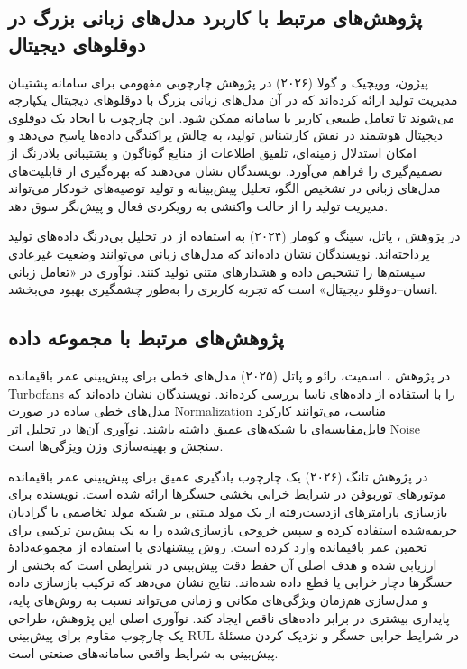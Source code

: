 \subsection{پژوهش‌های مرتبط با کاربرد مدل‌های زبانی بزرگ در دوقلوهای دیجیتال}

پیژون، وویچیک و گولا (۲۰۲۶) در پژوهش 
\cite{Pizon2026integrating} چارچوبی مفهومی برای سامانه پشتیبان مدیریت تولید ارائه کرده‌اند که در آن مدل‌های زبانی بزرگ با دوقلوهای دیجیتال یکپارچه می‌شوند تا تعامل طبیعی کاربر با سامانه ممکن شود. این چارچوب با ایجاد یک دوقلوی دیجیتال هوشمند در نقش کارشناس تولید، به چالش پراکندگی داده‌ها پاسخ می‌دهد و امکان استدلال زمینه‌ای، تلفیق اطلاعات از منابع گوناگون و پشتیبانی بلادرنگ از تصمیم‌گیری را فراهم می‌آورد. نویسندگان نشان می‌دهند که بهره‌گیری از قابلیت‌های مدل‌های زبانی در تشخیص الگو، تحلیل پیش‌بینانه و تولید توصیه‌های خودکار می‌تواند مدیریت تولید را از حالت واکنشی به رویکردی فعال و پیش‌نگر سوق دهد.



در پژوهش \cite{patel2024llmdt}،
پاتل، سینگ و کومار (۲۰۲۴)
   به استفاده از  در تحلیل بی‌درنگ داده‌های تولید پرداخته‌اند. نویسندگان نشان داده‌اند که مدل‌های زبانی می‌توانند وضعیت غیرعادی سیستم‌ها را تشخیص داده و هشدارهای متنی تولید کنند. نوآوری در «تعامل زبانی انسان–دوقلو دیجیتال» است که تجربه کاربری را به‌طور چشمگیری بهبود می‌بخشد.



\subsection{پژوهش‌های مرتبط با مجموعه داده }

در پژوهش
 \cite{smith2025cmapsslinear}،
اسمیت، رائو و پاتل (۲۰۲۵)
    مدل‌های خطی برای پیش‌بینی عمر باقیمانده 
    \glspl{Turbofan}
     را با استفاده از داده‌های 
	  ناسا بررسی کرده‌اند. نویسندگان نشان داده‌اند که مدل‌های خطی ساده در صورت \gls{Normalization} مناسب، می‌توانند کارکرد قابل‌مقایسه‌ای با شبکه‌های عمیق داشته باشند. نوآوری آن‌ها در تحلیل اثر \gls{Noise} سنجش و بهینه‌سازی وزن ویژگی‌ها است.

	

در پژوهش
تانگ (۲۰۲۶)
\cite{tang2026sensorfailure}
یک چارچوب یادگیری عمیق برای پیش‌بینی عمر باقیمانده موتورهای توربوفن در شرایط خرابی بخشی حسگرها ارائه شده است. نویسنده برای بازسازی پارامترهای ازدست‌رفته از یک مولد مبتنی بر شبکه مولد تخاصمی با گرادیان جریمه‌شده استفاده کرده و سپس خروجی بازسازی‌شده را به یک پیش‌بین ترکیبی
برای تخمین عمر باقیمانده وارد کرده است. روش پیشنهادی با استفاده از مجموعه‌دادهٔ  ارزیابی شده و هدف اصلی آن حفظ دقت پیش‌بینی در شرایطی است که بخشی از حسگرها دچار خرابی یا قطع داده شده‌اند. نتایج نشان می‌دهد که ترکیب بازسازی داده و مدل‌سازی هم‌زمان ویژگی‌های مکانی و زمانی می‌تواند نسبت به روش‌های پایه، پایداری بیشتری در برابر داده‌های ناقص ایجاد کند. نوآوری اصلی این پژوهش، طراحی یک چارچوب مقاوم برای پیش‌بینی \gls{RUL} در شرایط خرابی حسگر و نزدیک کردن مسئلهٔ پیش‌بینی به شرایط واقعی سامانه‌های صنعتی است.




